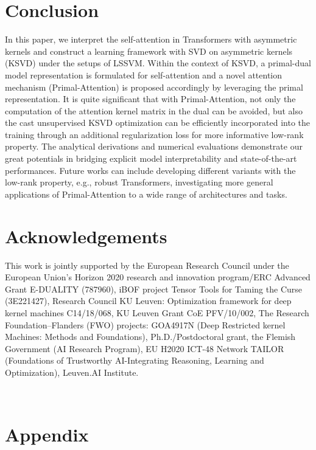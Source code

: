 \documentclass{article}
\begin{document}
\section{Conclusion}
\label{sec::conclusion}
In this paper, we interpret the self-attention in Transformers with asymmetric kernels and construct a learning framework with SVD on asymmetric kernels (KSVD) under the setups of LSSVM. 
Within the context of KSVD, a primal-dual model representation is formulated for self-attention and 
a novel attention mechanism (Primal-Attention) is proposed accordingly by leveraging the primal representation. 
It is quite significant that with Primal-Attention, not only the computation of the attention kernel matrix in the dual can be avoided, but also the cast unsupervised KSVD optimization can be efficiently incorporated into the training  through an additional regularization loss for more informative low-rank property. The analytical derivations and numerical evaluations demonstrate our great potentials in bridging explicit model interpretability and state-of-the-art performances.
Future works can include developing different variants with the low-rank property, e.g., robust Transformers, investigating more general applications of Primal-Attention to a wide range of architectures and tasks.

\section*{Acknowledgements}
This work is jointly supported by the European Research Council under the European Union’s Horizon 2020 research and innovation program/ERC Advanced Grant E-DUALITY (787960), iBOF project Tensor Tools for Taming the Curse (3E221427), Research Council KU Leuven: Optimization framework for deep kernel machines C14/18/068,  KU Leuven Grant CoE PFV/10/002, The Research Foundation–Flanders (FWO) projects: GOA4917N (Deep Restricted kernel Machines: Methods and Foundations), Ph.D./Postdoctoral grant, the Flemish Government (AI Research Program), EU H2020 ICT-48 Network TAILOR (Foundations of Trustworthy AI-Integrating Reasoning, Learning and Optimization), Leuven.AI Institute.


 

\appendix
~\\
\section*{Appendix}
\end{document}
